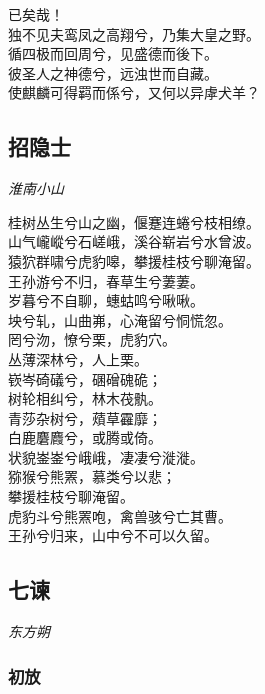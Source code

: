 \documentclass[]{article}
\begin{document}
已矣哉！\\
独不见夫鸾凤之高翔兮，乃集大皇之野。\\
循四极而回周兮，见盛德而後下。\\
彼圣人之神德兮，远浊世而自藏。\\
使麒麟可得羁而係兮，又何以异虖犬羊？

\hypertarget{header-n2976}{%
\subsection{招隐士}\label{header-n2976}}

\emph{淮南小山}

桂树丛生兮山之幽，偃蹇连蜷兮枝相缭。\\
山气巄嵷兮石嵯峨，溪谷崭岩兮水曾波。\\
猿狖群啸兮虎豹嗥，攀援桂枝兮聊淹留。\\
王孙游兮不归，春草生兮萋萋。\\
岁暮兮不自聊，蟪蛄鸣兮啾啾。\\
坱兮轧，山曲岪，心淹留兮恫慌忽。\\
罔兮沕，憭兮栗，虎豹穴。\\
丛薄深林兮，人上栗。\\
嵚岑碕礒兮，碅磳磈硊；\\
树轮相纠兮，林木茷骫。\\
青莎杂树兮，薠草靃靡；\\
白鹿麏麚兮，或腾或倚。\\
状貌崟崟兮峨峨，凄凄兮漇漇。\\
猕猴兮熊罴，慕类兮以悲；\\
攀援桂枝兮聊淹留。\\
虎豹斗兮熊罴咆，禽兽骇兮亡其曹。\\
王孙兮归来，山中兮不可以久留。

\hypertarget{header-n2981}{%
\subsection{七谏}\label{header-n2981}}

\emph{东方朔}

\hypertarget{header-n2986}{%
\subsubsection{初放}\label{header-n2986}}
\end{document}
